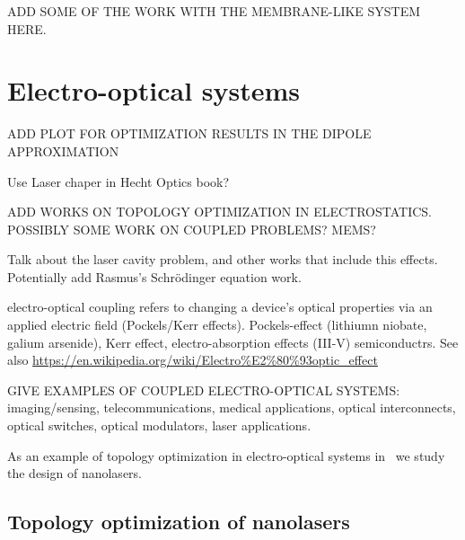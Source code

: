 ADD SOME OF THE WORK WITH THE MEMBRANE-LIKE SYSTEM HERE.


\section{Electro-optical systems~\cite{ownpub4}}

ADD PLOT FOR OPTIMIZATION RESULTS IN THE DIPOLE APPROXIMATION

Use Laser chaper in Hecht Optics book?



ADD WORKS ON TOPOLOGY OPTIMIZATION IN ELECTROSTATICS. POSSIBLY SOME WORK
ON COUPLED PROBLEMS? MEMS?

Talk about the laser cavity problem, and other works that include this effects.
Potentially add Rasmus's Schrödinger equation work.

electro-optical coupling refers to changing a device’s optical properties via an applied electric field (Pockels/Kerr effects). Pockels-effect (lithiumn niobate, galium arsenide), Kerr effect, electro-absorption effects (III-V) semiconductrs.
See also \url{https://en.wikipedia.org/wiki/Electro%E2%80%93optic_effect}

GIVE EXAMPLES OF COUPLED ELECTRO-OPTICAL SYSTEMS: imaging/sensing, telecommunications,
medical applications, optical interconnects, optical switches, optical modulators,
laser applications.

As an example of topology optimization in electro-optical systems in~\cite{ownpub4} we study the design of nanolasers. 

\subsection*{Topology optimization of nanolasers~\cite{ownpub4}}

